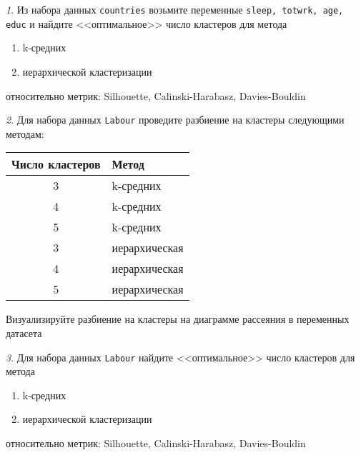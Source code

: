 \documentclass[12pt]{article}
\theoremstyle{remark}
\newtheorem{exercise}{}[section]
\begin{document}
\begin{exercise}
Из набора данных \texttt{countries} возьмите переменные 
\texttt{sleep, totwrk, age, educ} и найдите <<оптимальное>> число кластеров
для метода
\begin{enumerate}
	\item k-средних
	\item иерархической кластеризации
\end{enumerate}
относительно метрик: Silhouette, Calinski-Harabasz, Davies-Bouldin
\end{exercise}

\begin{exercise}
Для набора данных \texttt{Labour} проведите разбиение на кластеры следующими
методам:
\begin{center}
	\begin{tabular}{c|l}
		Число кластеров & Метод \\ \hline
		3 & k-средних \\
		4 & k-средних \\
		5 & k-средних \\
		3 & иерархическая \\
		4 & иерархическая \\
		5 & иерархическая \\ \hline
	\end{tabular}
\end{center}
Визуализируйте разбиение на кластеры на диаграмме рассеяния в переменных датасета
\end{exercise}
	
\begin{exercise}
Для набора данных \texttt{Labour} найдите <<оптимальное>> число кластеров
для метода
\begin{enumerate}
	\item k-средних
	\item иерархической кластеризации
\end{enumerate}
относительно метрик: Silhouette, Calinski-Harabasz, Davies-Bouldin
\end{exercise}
\end{document}

